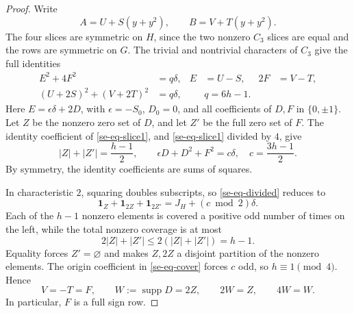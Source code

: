 \documentclass[11pt]{article}
\theoremstyle{definition}
\theoremstyle{remark}
\begin{document}
\begin{proof}
Write
\[
 A=U+S(y+y^2),\qquad B=V+T(y+y^2).
\]
The four slices are symmetric on $H$, since the two nonzero $C_3$ slices
are equal and the rows are symmetric on $G$.  The trivial and
nontrivial characters of $C_3$ give the full identities
\begin{align}
 E^2+4F^2&=q\delta,
 &E&=U-S,&2F&=V-T,\label{se-eq-slice1}\\
 (U+2S)^2+(V+2T)^2&=q\delta,
 &&q=6h-1.\label{se-eq-slice2}
\end{align}
Here $E=\epsilon\delta+2D$, with $\epsilon=-S_0$,
$D_0=0$, and all coefficients of $D,F$ in $\{0,\pm1\}$.
Let $Z$ be the nonzero zero set of $D$, and let $Z'$ be the full zero
set of $F$.  The identity coefficient of \eqref{se-eq-slice1}, and
\eqref{se-eq-slice1} divided by $4$, give
\begin{equation}
 |Z|+|Z'|=\frac{h-1}{2},\qquad
 \epsilon D+D^2+F^2=c\delta,
 \quad c=\frac{3h-1}{2}.
 \label{se-eq-divided}
\end{equation}
By symmetry, the identity coefficients are sums of squares.

In characteristic $2$, squaring doubles subscripts, so
\eqref{se-eq-divided} reduces to
\begin{equation}
 \mathbf1_Z+\mathbf1_{2Z}+\mathbf1_{2Z'}
        =J_H+(c\bmod2)\delta.
 \label{se-eq-cover}
\end{equation}
Each of the $h-1$ nonzero elements is covered a positive odd number of
times on the left, while the total nonzero coverage is at most
\[
 2|Z|+|Z'|\le2(|Z|+|Z'|)=h-1.
\]
Equality forces $Z'=\varnothing$ and makes $Z,2Z$ a disjoint
partition of the nonzero elements.  The origin coefficient in
\eqref{se-eq-cover} forces $c$ odd, so $h\equiv1\pmod4$.  Hence
\begin{equation}
 V=-T=F,\qquad W:=\operatorname{supp}D=2Z,
 \qquad2W=Z,\qquad4W=W.
 \label{se-eq-tiling}
\end{equation}
In particular, $F$ is a full sign row.


\end{proof}
\end{document}
